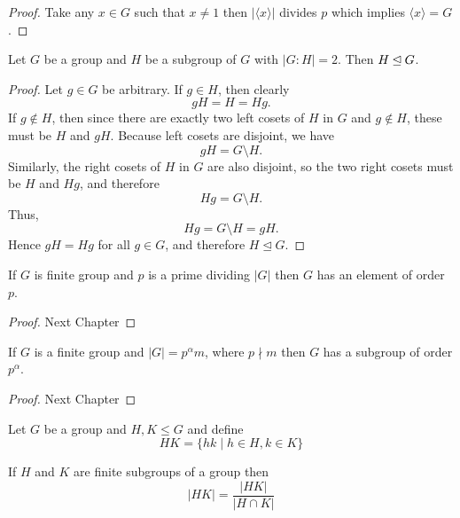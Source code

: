 \begin{proof}
    Take any $x \in G$ such that $x \neq 1$ then $|\langle x \rangle|$ divides $p$ which implies  $\langle x \rangle = G$. 
\end{proof}

\begin{proposition}
    Let $G$ be a group and $H$ be a subgroup of $G$ with $|G:H|=2$. Then $H \unlhd G$. 
\end{proposition}

\begin{proof}
Let \( g \in G \) be arbitrary. If \( g \in H \), then clearly
\[
gH = H = Hg.
\]
If \( g \notin H \), then since there are exactly two left cosets of \( H \) in \( G \)
and \( g \notin H \), these must be \( H \) and \( gH \).
Because left cosets are disjoint, we have
\[
gH = G \setminus H.
\]
Similarly, the right cosets of \( H \) in \( G \) are also disjoint, 
so the two right cosets must be \( H \) and \( Hg \),
and therefore
\[
Hg = G \setminus H.
\]
Thus,
\[
Hg = G \setminus H = gH.
\]
Hence \( gH = Hg \) for all \( g \in G \),
and therefore \( H \trianglelefteq G \).
\end{proof}


\begin{theorem}
    If $G$ is finite group and $p$ is a prime dividing $|G|$ then $G$ has an element of order $p$. 
\end{theorem}

\begin{proof}
    Next Chapter 
\end{proof}

\begin{theorem}
    If $G$ is a finite group and $|G|=p^{\alpha}m$, where $p \nmid m$ then $G$ has a subgroup of order $p^{\alpha}$.
\end{theorem}

\begin{proof}
    Next Chapter
\end{proof}

\begin{definition}
    Let $G$ be a group and $H,K \le G$ and define
    \[ HK = \{hk \mid h \in H, k \in K\} \]
\end{definition}

\begin{proposition}
    If $H$ and $K$ are finite subgroups of a group then
    \[ |HK| = \frac{|HK|}{|H \cap K|} \]
\end{proposition}

